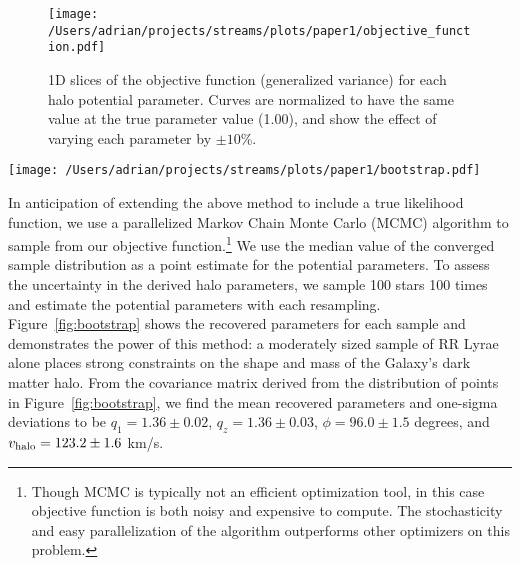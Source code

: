 \documentclass{emulateapj}
\begin{document}
\begin{figure}[h]
\begin{center}
\texttt{[image: /Users/adrian/projects/streams/plots/paper1/objective\_function.pdf]}
\caption{ 1D slices of the objective function (generalized variance) for each halo potential parameter. Curves are normalized to have the same value at the true parameter value (1.00), and show the effect of varying each parameter by $\pm10$\%. }\label{fig:objective}
\end{center}
\end{figure}

\begin{figure*}[ht!]
\centering\texttt{[image: /Users/adrian/projects/streams/plots/paper1/bootstrap.pdf]}
\caption{ Blue points show the ``best-fit'' parameters resulting from each resample of 100 stars from the Sgr stream particle density shown in Figure~\ref{fig:lm10}. Green (vertical and horizontal) lines show the true values of the parameters. Grey ellipses show one- and two-sigma margins, assuming the points are normally distributed. }\label{fig:bootstrap}
\end{figure*}	

In anticipation of extending the above method to include a true
likelihood function, we use a parallelized Markov Chain Monte Carlo
(MCMC) algorithm \citep{foremanmackey2013} to sample from our
objective function.\footnote{Though MCMC is typically not an efficient
  optimization tool, in this case objective function is both noisy and
  expensive to compute. The stochasticity and easy parallelization of
  the algorithm outperforms other optimizers on this problem.}
We use the median value of the converged sample distribution as a
point estimate for the potential parameters. To assess the uncertainty
in the derived halo parameters, we sample 100 stars
100 times and estimate the potential parameters with each
resampling. Figure~\ref{fig:bootstrap} shows the recovered parameters
for each sample and demonstrates the power of this method:
a moderately sized sample of RR Lyrae
alone places strong constraints on the shape and mass of the
Galaxy's dark matter halo. From the covariance matrix derived from the 
distribution of points in Figure~\ref{fig:bootstrap}, we find the mean 
recovered parameters and one-sigma deviations to be 
$q_1 = 1.36 \pm 0.02$, $q_z = 1.36 \pm 0.03$, $\phi = 96.0 \pm 1.5$ degrees,
and $v_{\rm halo} = 123.2 \pm 1.6$ km/s.
\end{document}
